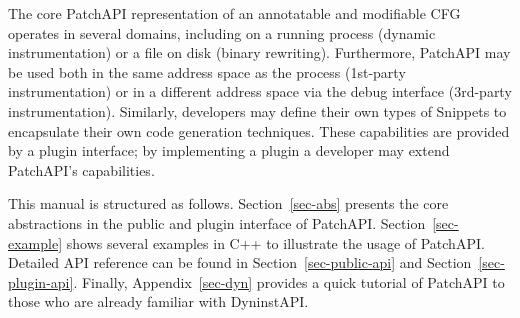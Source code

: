 The core PatchAPI representation of an annotatable and modifiable CFG
operates in several domains, including on a running process (dynamic
instrumentation) or a file on disk (binary rewriting). Furthermore,
PatchAPI may be used both in the same address space as the process
(1st-party instrumentation) or in a different address space via the
debug interface (3rd-party instrumentation). Similarly, developers may
define their own types of Snippets to encapsulate their own code
generation techniques. These capabilities are provided by a plugin
interface; by implementing a plugin a developer may extend PatchAPI's
capabilities.

This manual is structured as follows. Section~\ref{sec-abs} presents the core
abstractions in the public and plugin interface of
PatchAPI. Section~\ref{sec-example} shows several examples in C++ to illustrate
the usage of PatchAPI. Detailed API reference can be found in
Section~\ref{sec-public-api} and Section~\ref{sec-plugin-api}. Finally,
Appendix~\ref{sec-dyn} provides a quick tutorial of PatchAPI to those who are
already familiar with DyninstAPI.
